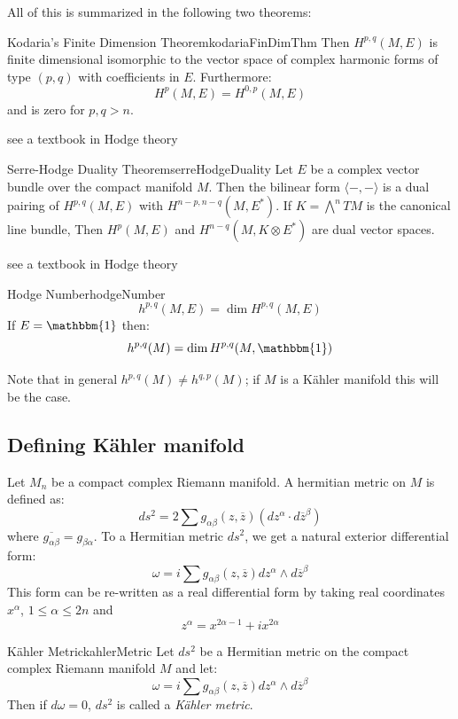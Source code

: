 \documentclass{book}
\begin{document}
All of this is summarized in the following two theorems:

\begin{thm}{Kodaria's Finite Dimension Theorem}{kodariaFinDimThm}
   Then $H^{p,q}(M,E)$ is finite dimensional
  isomorphic to the vector space of complex harmonic forms of type $(p,q)$ with coefficients in $E$.
  Furthermore:
  \[
    H^p(M,E) = H^{0,p}(M,E)
  \]
  and is zero for $p,q > n$.
\end{thm}

\begin{Proof}
  see a textbook in Hodge theory
\end{Proof}

\begin{thm}{Serre-Hodge Duality Theorem}{serreHodgeDuality}
  Let $E$ be a complex vector bundle over the compact manifold $M$. Then the bilinear form $\langle -,-
  \rangle$ is a dual pairing of $H^{p,q}(M,E)$ with $H^{n-p, n-q}(M, E^*)$. If $K = \bigwedge^n TM$ is the
  canonical line bundle, Then $H^p(M,E)$ and $H^{n-q}(M, K\otimes E^*)$ are dual vector spaces.
\end{thm}

\begin{Proof}
  see a textbook in Hodge theory
\end{Proof}

\begin{defn}{Hodge Number}{hodgeNumber}
  \[
    h^{p,q}(M,E) = \dim H^{p,q}(M,E)
  \]
  If $E = \mathbbm{1}$ then:
  \[
    h^{p,q}(M) = \dim H^{p,q}(M,\mathbbm{1})
  \]
\end{defn}

Note that in general $h^{p,q}(M) \ne h^{q,p}(M)$; if $M$ is a K\"ahler manifold this will be the case.


\subsection{Defining K\"ahler manifold}

Let $M_n$ be a compact complex Riemann manifold. A hermitian metric on $M$ is defined as:
\[
  ds^2 = 2 \sum g_{\alpha\beta}(z, \overline{z}) (dz^\alpha \cdot d \overline{z}^\beta)
\]
where $\overline{g_{\alpha\beta}} = g_{\beta\alpha}$. To a Hermitian metric $ds^2$, we get a natural exterior
differential form:
\[
  \omega = i\sum g_{\alpha\beta}(z, \overline{z}) dz^\alpha \wedge  d \overline{z}^\beta
\]
This form can be re-written as a real differential form by taking real coordinates $x^\alpha$, $1 \le \alpha
\le 2n$ and
\[
  z^\alpha = x^{2\alpha-1} + ix^{2\alpha}
\]
\begin{defn}{K\"ahler Metric}{kahlerMetric}
  Let $ds^2$ be a Hermitian metric on the compact complex Riemann manifold $M$ and let:
  \[
    \omega = i\sum g_{\alpha\beta}(z, \overline{z}) dz^\alpha \wedge  d \overline{z}^\beta
  \]
  Then if $d\omega = 0$, $ds^2$ is called a \emph{K\"ahler metric}.
\end{defn}
\end{document}
